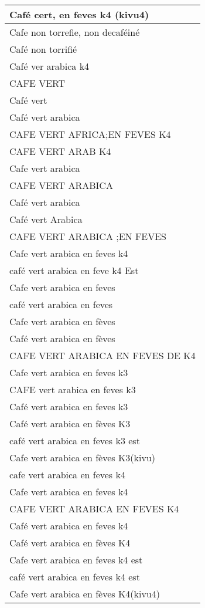 \documentclass[
]{book}
\begin{document}
\begin{table}
\begin{tabular}[t]{l}
\hline
Café cert, en feves k4 (kivu4)\\
\hline
Cafe non torrefie, non decaféiné\\
\hline
Café non torrifié\\
\hline
Café ver arabica k4\\
\hline
CAFE VERT\\
\hline
Café vert\\
\hline
Café vert  arabica\\
\hline
CAFE VERT AFRICA;EN FEVES K4\\
\hline
CAFE VERT ARAB K4\\
\hline
Cafe vert arabica\\
\hline
CAFE VERT ARABICA\\
\hline
Café vert arabica\\
\hline
Café vert Arabica\\
\hline
CAFE VERT ARABICA ;EN FEVES\\
\hline
Cafe vert arabica en  feves k4\\
\hline
café vert arabica en feve k4 Est\\
\hline
Cafe vert arabica en feves\\
\hline
café vert arabica en feves\\
\hline
Cafe vert arabica en fèves\\
\hline
Café vert arabica en fèves\\
\hline
CAFE VERT ARABICA EN FEVES DE K4\\
\hline
Cafe vert arabica en feves k3\\
\hline
CAFE vert arabica en feves k3\\
\hline
Café vert arabica en feves k3\\
\hline
Café vert arabica en fèves K3\\
\hline
café vert arabica en feves k3 est\\
\hline
Cafe vert arabica en fèves K3(kivu)\\
\hline
cafe vert arabica en feves k4\\
\hline
Cafe vert arabica en feves k4\\
\hline
CAFE VERT ARABICA EN FEVES K4\\
\hline
Café vert arabica en feves k4\\
\hline
Café vert arabica en fèves K4\\
\hline
Cafe vert arabica en feves k4 est\\
\hline
café vert arabica en feves k4 est\\
\hline
Cafe vert arabica en fèves K4(kivu4)\\

\end{tabular}
\end{table}
\end{document}
